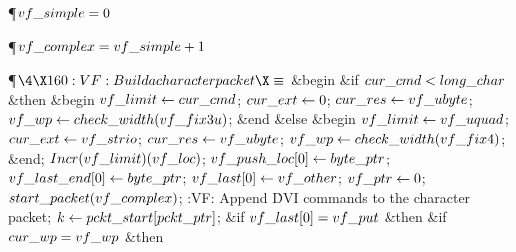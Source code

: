 \Y\P\D {}$\\{vf\_simple}=0$\par
\P\D {}$\\{vf\_complex}=\\{vf\_simple}+1$\par
\Y\P$\4\X160:VF: Build a character packet\X\S$\6
\&{begin} \&{if} $\\{cur\_cmd}<\\{long\_char}$ \1\&{then}\6
\&{begin} $\\{vf\_limit}\gets\\{cur\_cmd}$;\5
$\\{cur\_ext}\gets0$;\5
$\\{cur\_res}\gets\\{vf\_ubyte}$;\5
$\\{vf\_wp}\gets\\{check\_width}(\\{vf\_fix3u})$;\6
\&{end}\6
\4\&{else} \&{begin} $\\{vf\_limit}\gets\\{vf\_uquad}$;\5
$\\{cur\_ext}\gets\\{vf\_strio}$;\5
$\\{cur\_res}\gets\\{vf\_ubyte}$;\5
$\\{vf\_wp}\gets\\{check\_width}(\\{vf\_fix4})$;\6
\&{end};\2\6
$\\{Incr}(\\{vf\_limit})(\\{vf\_loc})$;\5
$\\{vf\_push\_loc}[0]\gets\\{byte\_ptr}$;\5
$\\{vf\_last\_end}[0]\gets\\{byte\_ptr}$;\5
$\\{vf\_last}[0]\gets\\{vf\_other}$;\5
$\\{vf\_ptr}\gets0$;\6
$\\{start\_packet}(\\{vf\_complex})$;\5
:VF: Append \.{DVI} commands to the character packet\X;\6
$\hbox{$k$}\gets\\{pckt\_start}[\\{pckt\_ptr}]$;\6
\&{if} $\\{vf\_last}[0]=\\{vf\_put}$ \1\&{then}\6
\&{if} $\\{cur\_wp}=\\{vf\_wp}$ \1\&{then}\6
